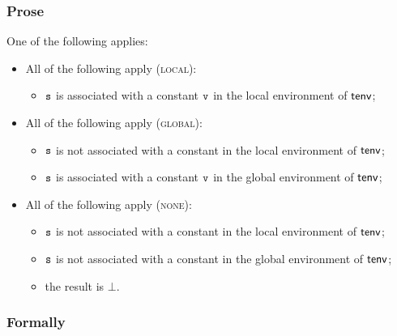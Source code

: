 \subsubsection{Prose}
One of the following applies:
\begin{itemize}
  \item All of the following apply (\textsc{local}):
  \begin{itemize}
    \item $\texttt{s}$ is associated with a constant $\texttt{v}$ in the local environment of $\textsf{tenv}$;
  \end{itemize}

  \item All of the following apply (\textsc{global}):
  \begin{itemize}
    \item $\texttt{s}$ is not associated with a constant in the local environment of $\textsf{tenv}$;
    \item $\texttt{s}$ is associated with a constant $\texttt{v}$ in the global environment of $\textsf{tenv}$;
  \end{itemize}

  \item All of the following apply (\textsc{none}):
  \begin{itemize}
    \item $\texttt{s}$ is not associated with a constant in the local environment of $\textsf{tenv}$;
    \item $\texttt{s}$ is not associated with a constant in the global environment of $\textsf{tenv}$;
    \item the result is $\bot$.
  \end{itemize}
\end{itemize}

\subsubsection{Formally}


